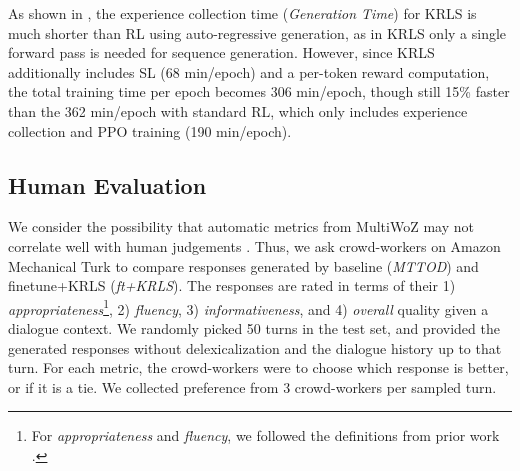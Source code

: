 As shown in , the experience collection time (\emph{Generation Time}) for KRLS is much shorter than RL using auto-regressive generation, as in KRLS only a single forward pass is needed for sequence generation. However, since KRLS additionally includes SL (68 min/epoch) and a per-token reward computation, the total training time per epoch becomes 306 min/epoch, though still 15\% faster than the 362 min/epoch with standard RL, which only includes experience collection and PPO training (190 min/epoch).
\begin{table}[!t]
  \centering
  \caption{Human evaluation on the generated responses. * indicates $p<0.01$. Fluency result has no statistical significance due to large variances among annotators.}
  \vspace{-5pt}
  \label{tbl:human_eval}
\end{table}

\subsection{Human Evaluation}
\label{subsec:Human Evaluation}
We consider the possibility that automatic metrics from MultiWoZ may not correlate well with human judgements \cite{liu2016not, lubis-etal-2022-dialogue}. 
Thus, we ask crowd-workers on Amazon Mechanical Turk to compare responses generated by baseline (\emph{MTTOD}) and finetune+KRLS (\emph{ft+KRLS}). The responses are rated in terms of their 1) \emph{appropriateness}\footnote{For \emph{appropriateness} and \emph{fluency}, we followed the definitions from prior work \cite{zhang2020task, ramachandran2021causal, gptcritic, feng2023fantastic}.}, 
2) \emph{fluency}, 
3) \emph{informativeness}, and 4) \emph{overall} quality given a dialogue context.
We randomly picked 50 turns in the test set, and provided the generated responses without delexicalization and the dialogue history up to that turn. For each metric, the crowd-workers were to choose which response is better, or if it is a tie. 
We collected preference from 3 crowd-workers per sampled turn. 

